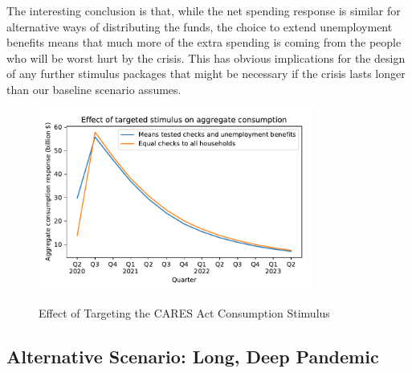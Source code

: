 \documentclass[titlepage]{\econtex}
\begin{document}
The interesting conclusion is that, while the net spending response is similar for alternative ways of distributing the funds, the choice to extend unemployment benefits means that much more of the extra spending is coming from the people who will be worst hurt by the crisis.  This has obvious implications for the design of any further stimulus packages that might be necessary if the crisis lasts longer than our baseline scenario assumes.

\begin{figure}
  \centering
  \caption{Effect of Targeting the CARES Act Consumption Stimulus}
  \label{EffectTargeting}
  { \includegraphics[width=0.8\textwidth]{./Figures/EffectTargeting}}
\end{figure}


\subsection{Alternative Scenario: Long, Deep Pandemic} \label{sec:longPandemic}
\end{document}
